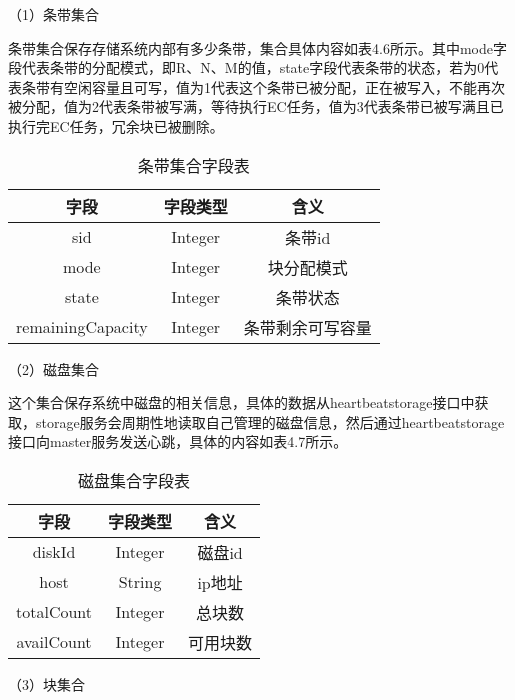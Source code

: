 （1）条带集合

条带集合保存存储系统内部有多少条带，集合具体内容如表4.6所示。其中mode字段代表条带的分配模式，即R、N、M的值，state字段代表条带的状态，若为0代表条带有空闲容量且可写，值为1代表这个条带已被分配，正在被写入，不能再次被分配，值为2代表条带被写满，等待执行EC任务，值为3代表条带已被写满且已执行完EC任务，冗余块已被删除。

\begin{table}[h]
    \centering
    \vspace{10pt}
    \caption{条带集合字段表}
    \vspace{-15pt}
    \begin{tabular}{ccc}
      \toprule
      字段   & 字段类型   & 含义                          \\
      \midrule
      sid               & Integer   & 条带id             \\
      mode              & Integer   & 块分配模式          \\
      state             & Integer   & 条带状态            \\
      remainingCapacity & Integer   & 条带剩余可写容量     \\
      \bottomrule
    \end{tabular}
\end{table}

（2）磁盘集合

这个集合保存系统中磁盘的相关信息，具体的数据从heartbeatstorage接口中获取，storage服务会周期性地读取自己管理的磁盘信息，然后通过heartbeatstorage接口向master服务发送心跳，具体的内容如表4.7所示。

\begin{table}[h]
  \centering
  \vspace{10pt}
  \caption{磁盘集合字段表}
  \vspace{-15pt}
  \begin{tabular}{ccc}
    \toprule
    字段   & 字段类型   & 含义          \\
    \midrule
    diskId     & Integer   & 磁盘id    \\
    host       & String    & ip地址    \\
    totalCount & Integer   & 总块数    \\
    availCount & Integer   & 可用块数  \\
    \bottomrule
  \end{tabular}
\end{table}

（3）块集合

